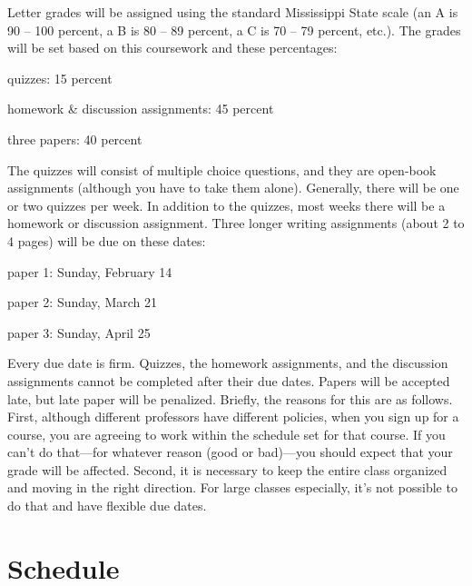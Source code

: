 \documentclass[11pt,oneside]{article}
\begin{document}
Letter grades will be assigned using the standard Mississippi State scale (an A is 90 – 100 percent, a B is 80 – 89 percent, a C is 70 – 79 percent, etc.). The grades will be set based on this coursework and these percentages:
\begin{description}
\item quizzes: 15 percent
\item homework \& discussion assignments: 45 percent
\item three papers: 40 percent
\end{description}
The quizzes will consist of multiple choice questions, and they are open-book assignments
(although you have to take them alone). Generally, there will be one or two quizzes per week.
In addition to the quizzes, most weeks there will be a homework or discussion assignment. 
Three longer writing assignments (about 2 to 4 pages) will be due on these dates:
\begin{description}
\item paper 1: Sunday, February 14
\item paper 2: Sunday, March 21
\item paper 3: Sunday, April 25
\end{description}
Every due date is firm. Quizzes, the homework assignments, and the discussion assignments cannot be completed after their due dates. Papers will be accepted late, but late paper will be penalized. Briefly, the reasons for this are as follows. First, although different professors have different policies, when you sign up for a course, you are agreeing to work within the schedule set for that course. If you can’t do that—for whatever reason (good or bad)—you should expect that your grade will be affected. Second, it is necessary
to keep the entire class organized and moving in the right direction. For large classes especially, it’s not possible to do that and have flexible due dates.




%




\section{Schedule}
\end{document}
